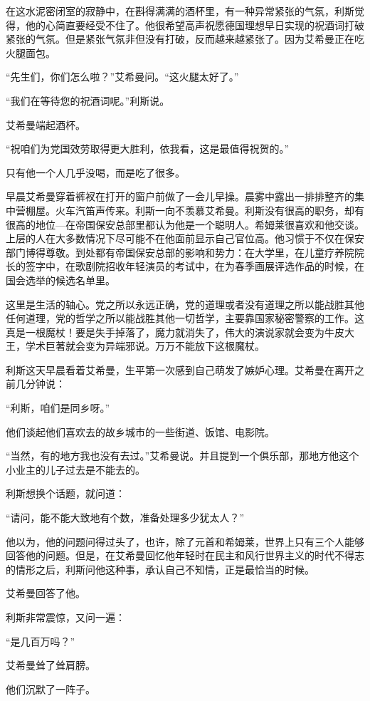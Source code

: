 在这水泥密闭室的寂静中，在斟得满满的酒杯里，有一种异常紧张的气氛，利斯觉得，他的心简直要经受不住了。他很希望高声祝愿德国理想早日实现的祝酒词打破紧张的气氛。但是紧张气氛非但没有打破，反而越来越紧张了。因为艾希曼正在吃火腿面包。

“先生们，你们怎么啦？”艾希曼问。“这火腿太好了。”

“我们在等待您的祝酒词呢。”利斯说。

艾希曼端起酒杯。

“祝咱们为党国效劳取得更大胜利，依我看，这是最值得祝贺的。”

只有他一个人几乎没喝，而是吃了很多。

早晨艾希曼穿着裤衩在打开的窗户前做了一会儿早操。晨雾中露出一排排整齐的集中营棚屋。火车汽笛声传来。利斯一向不羡慕艾希曼。利斯没有很高的职务，却有很高的地位—在帝国保安总部里都认为他是一个聪明人。希姆莱很喜欢和他交谈。上层的人在大多数情况下尽可能不在他面前显示自己官位高。他习惯于不仅在保安部门博得尊敬。到处都有帝国保安总部的影响和势力：在大学里，在儿童疗养院院长的签字中，在歌剧院招收年轻演员的考试中，在为春季画展评选作品的时候，在国会选举的候选名单里。

这里是生活的轴心。党之所以永远正确，党的道理或者没有道理之所以能战胜其他任何道理，党的哲学之所以能战胜其他一切哲学，主要靠国家秘密警察的工作。这真是一根魔杖！要是失手掉落了，魔力就消失了，伟大的演说家就会变为牛皮大王，学术巨著就会变为异端邪说。万万不能放下这根魔杖。

利斯这天早晨看着艾希曼，生平第一次感到自己萌发了嫉妒心理。艾希曼在离开之前几分钟说：

“利斯，咱们是同乡呀。”

他们谈起他们喜欢去的故乡城市的一些街道、饭馆、电影院。

“当然，有的地方我也没有去过。”艾希曼说。并且提到一个俱乐部，那地方他这个小业主的儿子过去是不能去的。

利斯想换个话题，就问道：

“请问，能不能大致地有个数，准备处理多少犹太人？”

他以为，他的问题问得过头了，也许，除了元首和希姆莱，世界上只有三个人能够回答他的问题。但是，在艾希曼回忆他年轻时在民主和风行世界主义的时代不得志的情形之后，利斯问他这种事，承认自己不知情，正是最恰当的时候。

艾希曼回答了他。

利斯非常震惊，又问一遍：

“是几百万吗？”

艾希曼耸了耸肩膀。

他们沉默了一阵子。

